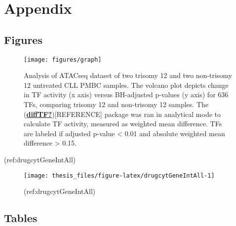 \documentclass[11pt, a4paper, twosided]{book}
\begin{document}
\newpage

\hypertarget{appendix}{%
\chapter*{Appendix}\label{appendix}}

\hypertarget{figures}{%
\section*{Figures}\label{figures}}


\begin{figure}

{\centering \texttt{[image: figures/graph]} 

}

\caption{Analysis of ATACseq dataset of two trisomy 12 and two non-trisomy 12 untreated CLL PMBC samples. The volcano plot depicts change in TF activity (x axis) versus BH-adjusted p-values (y axis) for 636 TFs, comparing trisomy 12 and non-trisomy 12 samples. The (\protect\hyperlink{ref-diffTF}{\textbf{diffTF?}}){[}REFERENCE{]} package was ran in analytical mode to calculate TF activity, measured as weighted mean difference. TFs are labeled if adjusted p-value \textless{} 0.01 and absolute weighted mean difference \textgreater{} 0.15.}\label{fig:diffTFsmallvolPlot}
\end{figure}
(ref:drugcytGeneIntAll)
\begin{figure}

{\centering \texttt{[image: thesis\_files/figure-latex/drugcytGeneIntAll-1]} 

}

\caption{(ref:drugcytGeneIntAll)}\label{fig:drugcytGeneIntAll}
\end{figure}
\hypertarget{tables}{%
\section*{Tables}\label{tables}}
\end{document}
